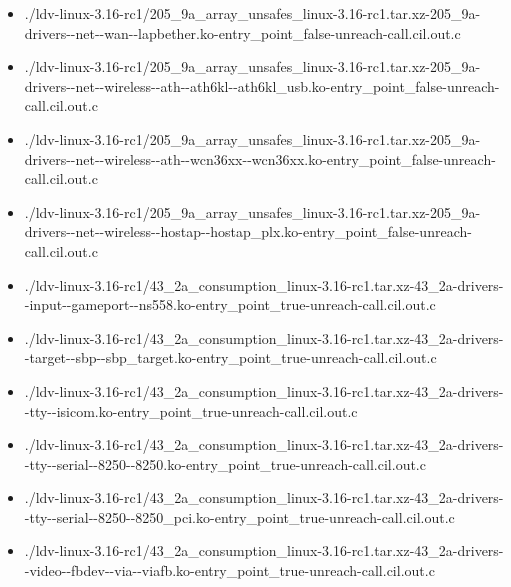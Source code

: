 \documentclass[envcountsame]{llncs}
\begin{document}
\begin{itemize}
\item ./ldv-linux-3.16-rc1/205\_9a\_array\_unsafes\_linux-3.16-rc1.tar.xz-205\_9a-drivers-{}-net-{}-wan-{}-lapbether.ko-entry\_point\_false-unreach-call.cil.out.c
\item ./ldv-linux-3.16-rc1/205\_9a\_array\_unsafes\_linux-3.16-rc1.tar.xz-205\_9a-drivers-{}-net-{}-wireless-{}-ath-{}-ath6kl-{}-ath6kl\_usb.ko-entry\_point\_false-unreach-call.cil.out.c
\item ./ldv-linux-3.16-rc1/205\_9a\_array\_unsafes\_linux-3.16-rc1.tar.xz-205\_9a-drivers-{}-net-{}-wireless-{}-ath-{}-wcn36xx-{}-wcn36xx.ko-entry\_point\_false-unreach-call.cil.out.c
\item ./ldv-linux-3.16-rc1/205\_9a\_array\_unsafes\_linux-3.16-rc1.tar.xz-205\_9a-drivers-{}-net-{}-wireless-{}-hostap-{}-hostap\_plx.ko-entry\_point\_false-unreach-call.cil.out.c
\item ./ldv-linux-3.16-rc1/43\_2a\_consumption\_linux-3.16-rc1.tar.xz-43\_2a-drivers-{}-input-{}-gameport-{}-ns558.ko-entry\_point\_true-unreach-call.cil.out.c
\item ./ldv-linux-3.16-rc1/43\_2a\_consumption\_linux-3.16-rc1.tar.xz-43\_2a-drivers-{}-target-{}-sbp-{}-sbp\_target.ko-entry\_point\_true-unreach-call.cil.out.c
\item ./ldv-linux-3.16-rc1/43\_2a\_consumption\_linux-3.16-rc1.tar.xz-43\_2a-drivers-{}-tty-{}-isicom.ko-entry\_point\_true-unreach-call.cil.out.c
\item ./ldv-linux-3.16-rc1/43\_2a\_consumption\_linux-3.16-rc1.tar.xz-43\_2a-drivers-{}-tty-{}-serial-{}-8250-{}-8250.ko-entry\_point\_true-unreach-call.cil.out.c
\item ./ldv-linux-3.16-rc1/43\_2a\_consumption\_linux-3.16-rc1.tar.xz-43\_2a-drivers-{}-tty-{}-serial-{}-8250-{}-8250\_pci.ko-entry\_point\_true-unreach-call.cil.out.c
\item ./ldv-linux-3.16-rc1/43\_2a\_consumption\_linux-3.16-rc1.tar.xz-43\_2a-drivers-{}-video-{}-fbdev-{}-via-{}-viafb.ko-entry\_point\_true-unreach-call.cil.out.c



\end{itemize}
\end{document}

